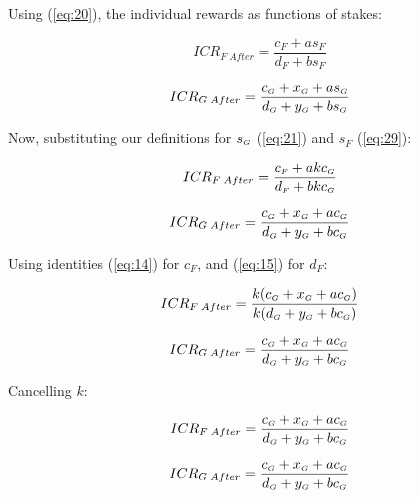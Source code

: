 \documentclass[reqno]{article}
\begin{document}
\bigskip
Using (\ref{eq:20}), the individual rewards as functions of stakes:

\begin{equation} 
    ICR_{F \; After}=\frac{c_F+as_F}{d_F+bs_F}
\end{equation}

\begin{equation} 
    ICR_{G \; After}=\frac{c_\mathsmaller{G}+x_\mathsmaller{G}+as_\mathsmaller{G}}{d_\mathsmaller{G}+y_\mathsmaller{G}+bs_\mathsmaller{G}}
\end{equation}

\bigskip
Now, substituting our definitions for $s_\mathsmaller{G}$ (\ref{eq:21}) and $s_F$ (\ref{eq:29}):

\begin{equation} 
    ICR_{F \; After}=\frac{c_\mathsmaller{F}+akc_\mathsmaller{G}}{d_\mathsmaller{F}+bkc_\mathsmaller{G}}
\end{equation}

\begin{equation} 
    ICR_{G \; After}=\frac{c_\mathsmaller{G}+x_\mathsmaller{G}+ac_\mathsmaller{G}}{d_\mathsmaller{G}+y_\mathsmaller{G}+bc_\mathsmaller{G}}
\end{equation}

\bigskip
Using identities (\ref{eq:14}) for $c_F$, and (\ref{eq:15}) for $d_F$:

\begin{equation} 
    ICR_{F \; After}=\frac{k(c_\mathsmaller{G} + x_\mathsmaller{G}+ac_\mathsmaller{G})}{k(d_\mathsmaller{G}+y_\mathsmaller{G}+bc_\mathsmaller{G})}
\end{equation}

\begin{equation} 
    ICR_{G \; After}=\frac{c_\mathsmaller{G}+x_\mathsmaller{G}+ac_\mathsmaller{G}}{d_\mathsmaller{G}+y_\mathsmaller{G}+bc_\mathsmaller{G}}
\end{equation}

\bigskip
Cancelling $k$:

\begin{equation} 
        ICR_{F \; After}=\frac{c_\mathsmaller{G} + x_\mathsmaller{G}+ac_\mathsmaller{G}}{d_\mathsmaller{G}+y_\mathsmaller{G}+bc_\mathsmaller{G}}
\end{equation}

\begin{equation} 
    ICR_{G \; After}=\frac{c_\mathsmaller{G}+x_\mathsmaller{G}+ac_\mathsmaller{G}}{d_\mathsmaller{G}+y_\mathsmaller{G}+bc_\mathsmaller{G}}
\end{equation}
\end{document}
